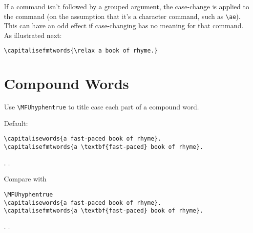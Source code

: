 \documentclass{article}
\begin{document}
\medskip

If a command isn't followed by a grouped argument, the
case-change is applied to the command (on the assumption
that it's a character command, such as \verb|\ae|). This can
have an odd effect if case-changing has no meaning for that command.
As illustrated next:

\verb|\capitalisefmtwords{\relax a book of rhyme.}|

\section{Compound Words}

Use \verb|\MFUhyphentrue| to title case each part of
a compound word.

Default:
\begin{verbatim}
\capitalisewords{a fast-paced book of rhyme}.
\capitalisefmtwords{a \textbf{fast-paced} book of rhyme}.
\end{verbatim}
.
.

Compare with
\begin{verbatim}
\MFUhyphentrue
\capitalisewords{a fast-paced book of rhyme}.
\capitalisefmtwords{a \textbf{fast-paced} book of rhyme}.
\end{verbatim}
\MFUhyphentrue
{}.
.
\end{document}

